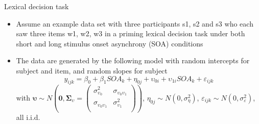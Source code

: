 \documentclass[aspectratio=169]{beamer}
\newcommand{\gvect}[1]{\boldsymbol{#1}}
\newcommand{\gmat}[1]{\boldsymbol{#1}}
\begin{document}
% 

\begin{frame}{Lexical decision task \citep{Baayen2008}}
  \begin{itemize}
    \item Assume an example data set with three participants s1, s2 and s3
      who each saw three items w1, w2, w3 in a priming lexical decision
      task under both short and long stimulus onset asynchrony (SOA) conditions
    \item The data are generated by the following model with random intercepts
      for subject and item, and random slopes for subject
  \[
    y_{ijk} = \beta_0 + \beta_1 SOA_k + \eta_{0j} + \upsilon_{0i} +
      \upsilon_{1i} SOA_k + \varepsilon_{ijk} 
  \]
\small
with $\gvect{\upsilon} \sim N\left(\gvect{0}, \gmat{\Sigma}_{\upsilon} = 
    \begin{pmatrix}
      \sigma^2_{\upsilon_0} & \sigma_{\upsilon_0\upsilon_1} \\
      \sigma_{\upsilon_0\upsilon_1} & \sigma^2_{\upsilon_1} \\
    \end{pmatrix}\right)$,
      $\eta_{0j} \sim N(0, \sigma_{\eta}^2)$, $\varepsilon_{ijk} \sim N(0,
  \sigma_{\varepsilon}^2)$, all i.i.d. 
  \end{itemize}
\end{frame}
\end{document}
